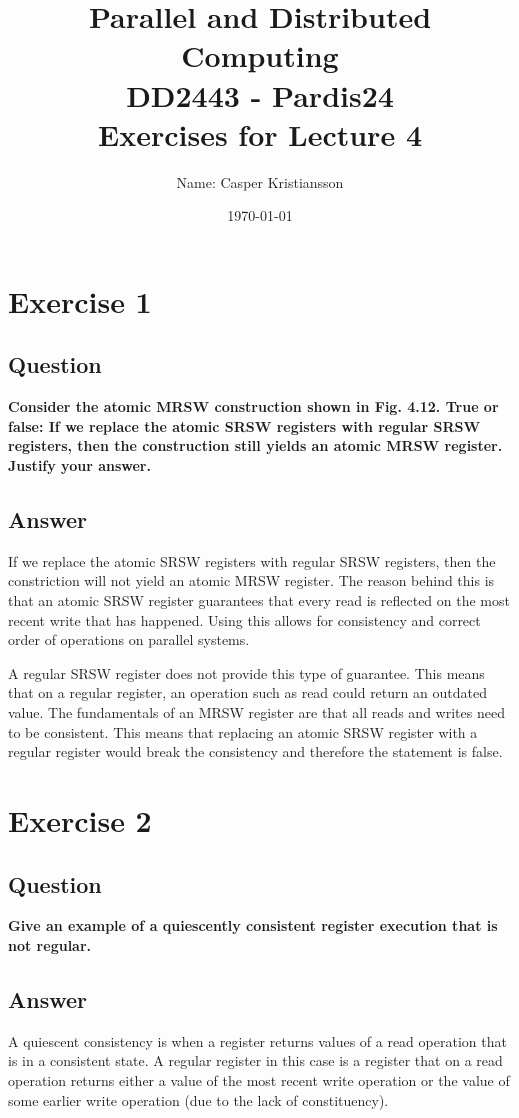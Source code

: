 \documentclass{article}
\title{\textbf{Parallel and Distributed Computing\\DD2443 - Pardis24\\Exercises for Lecture 4}}
\author{Name: Casper Kristiansson}
\date{\today}
\begin{document}
\setlength\parindent{0pt}
\setlength{\parskip}{\bigskipamount}

\maketitle

\section*{Exercise 1}
\subsection*{Question}
\textbf{Consider the atomic MRSW construction shown in Fig. 4.12. True or false: If we replace the atomic SRSW registers with regular SRSW registers, then the construction still yields an atomic MRSW register. Justify your answer.}

\subsection*{Answer}

If we replace the atomic SRSW registers with regular SRSW registers, then the constriction will not yield an atomic MRSW register. The reason behind this is that an atomic SRSW register guarantees that every read is reflected on the most recent write that has happened. Using this allows for consistency and correct order of operations on parallel systems.

A regular SRSW register does not provide this type of guarantee. This means that on a regular register, an operation such as read could return an outdated value. The fundamentals of an MRSW register are that all reads and writes need to be consistent. This means that replacing an atomic SRSW register with a regular register would break the consistency and therefore the statement is false.



\section*{Exercise 2}
\subsection*{Question}
\textbf{Give an example of a quiescently consistent register execution that is not regular.}

\subsection*{Answer}
A quiescent consistency is when a register returns values of a read operation that is in a consistent state. A regular register in this case is a register that on a read operation returns either a value of the most recent write operation or the value of some earlier write operation (due to the lack of constituency).
\end{document}
